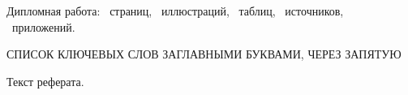 Дипломная работа: \ страниц, \totalfigures{}~иллюстраций, \totaltables{}\ таблиц,
\ источников, \ приложений.

\vspace{\baselineskip}

СПИСОК КЛЮЧЕВЫХ СЛОВ ЗАГЛАВНЫМИ БУКВАМИ, ЧЕРЕЗ ЗАПЯТУЮ

\vspace{\baselineskip}

Текст реферата.
